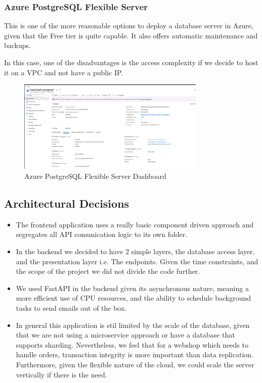 \documentclass{llncs}
\begin{document}
\subsubsection{Azure PostgreSQL Flexible Server}

This is one of the more reasonable options to deploy a database server in Azure, given that the Free tier is quite capable. It also offers automatic maintenance and backups.

In this case, one of the disadvantages is the access complexity if we decide to host it on a VPC and not have a public IP.\\

\begin{figure}[htbp]
    \centering
    \includegraphics[width=0.8\textwidth]{../images/database_azure.png}
    \vspace{0.01\textwidth}
    \caption{Azure PostgreSQL Flexible Server Dashboard}
    \label{fig:database_azure}
\end{figure}


\subsection{Architectural Decisions}

\begin{itemize}
    \item The frontend application uses a really basic component driven approach and segregates all API comunication logic to its own folder.
    \item In the backend we decided to have 2 simple layers, the database access layer, and the presentation layer i.e. The endpoints.
          Given the time constraints, and the scope of the project we did not divide the code further.
    \item We used FastAPI in the backend given its asynchronous nature, meaning a more efficient use of CPU resources, and the ability to schedule background tasks to send emails out of the box.
    \item In general this application is stil limited by the scale of the database, given that we are not using a microservice approach or have a database that supports sharding.
          Nevertheless, we feel that for a webshop which needs to handle orders, transaction integrity is more important than data replication. Furthermore, given the flexible nature of the cloud, we could scale the server vertically if there is the need.

\end{itemize}
\end{document}
